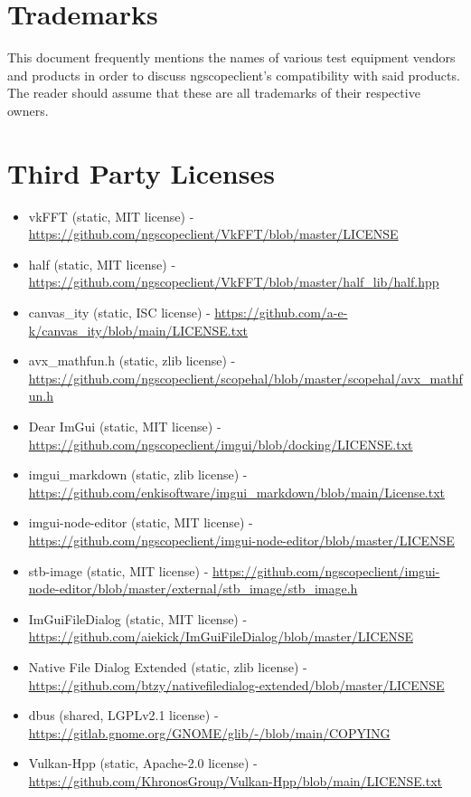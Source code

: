 \section{Trademarks}

This document frequently mentions the names of various test equipment vendors and products in order to discuss
ngscopeclient's compatibility with said products. The reader should assume that these are all trademarks of their
respective owners.

\section{Third Party Licenses}

\begin{itemize}
\item vkFFT (static, MIT license) - \url{https://github.com/ngscopeclient/VkFFT/blob/master/LICENSE}
\item half (static, MIT license) - \url{https://github.com/ngscopeclient/VkFFT/blob/master/half_lib/half.hpp}
\item canvas\_ity (static, ISC license) - \url{https://github.com/a-e-k/canvas_ity/blob/main/LICENSE.txt}
\item avx\_mathfun.h (static, zlib license) - \url{https://github.com/ngscopeclient/scopehal/blob/master/scopehal/avx_mathfun.h}
\item Dear ImGui (static, MIT license) - \url{https://github.com/ngscopeclient/imgui/blob/docking/LICENSE.txt}
\item imgui\_markdown (static, zlib license) - \url{https://github.com/enkisoftware/imgui_markdown/blob/main/License.txt}
\item imgui-node-editor (static, MIT license) - \url{https://github.com/ngscopeclient/imgui-node-editor/blob/master/LICENSE}
\item stb-image (static, MIT license) - \url{https://github.com/ngscopeclient/imgui-node-editor/blob/master/external/stb_image/stb_image.h}
\item ImGuiFileDialog (static, MIT license) - \url{https://github.com/aiekick/ImGuiFileDialog/blob/master/LICENSE}
\item Native File Dialog Extended (static, zlib license) - \url{https://github.com/btzy/nativefiledialog-extended/blob/master/LICENSE}
\item dbus (shared, LGPLv2.1 license) - \url{https://gitlab.gnome.org/GNOME/glib/-/blob/main/COPYING}
\item Vulkan-Hpp (static, Apache-2.0 license) - \url{https://github.com/KhronosGroup/Vulkan-Hpp/blob/main/LICENSE.txt}

\end{itemize}
